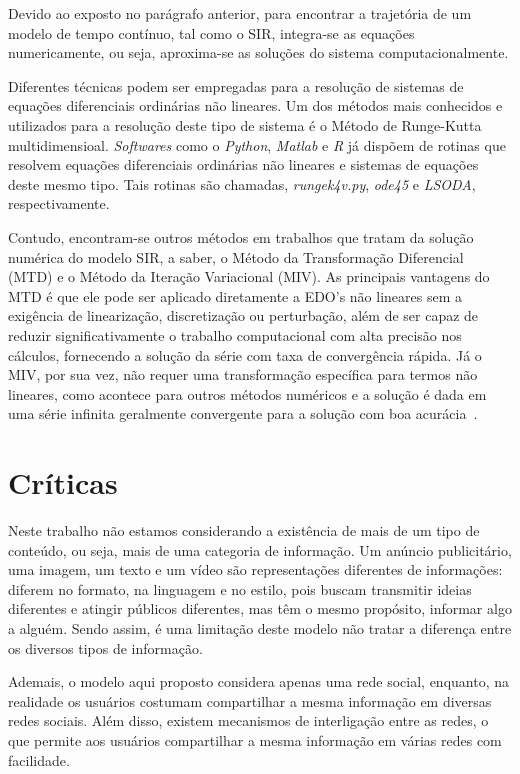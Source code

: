 \documentclass[
	12pt,				%
	openright,			%
	oneside,			%
	a4paper,			%
	english,			%
	french,				%
	spanish,			%
	brazil				%
	]{abntex2}
\begin{document}
Devido ao exposto no parágrafo anterior, para encontrar a trajetória
de um modelo de tempo contínuo, tal como o SIR, integra-se as equações
numericamente, ou seja, aproxima-se as soluções do sistema
computacionalmente.

Diferentes técnicas podem ser empregadas para a resolução de sistemas
de equações diferenciais ordinárias não lineares. Um dos métodos mais
conhecidos e utilizados para a resolução deste tipo de sistema é o
Método de Runge-Kutta multidimensioal. \emph{Softwares} como o
\emph{Python}, \emph{Matlab} e \emph{R} já dispõem de rotinas que
resolvem equações diferenciais ordinárias não lineares e sistemas de
equações deste mesmo tipo. Tais rotinas são chamadas,
\emph{rungek4v.py}, \emph{ode45} e \emph{LSODA}, respectivamente.

Contudo, encontram-se outros métodos em trabalhos que tratam da
solução numérica do modelo SIR, a saber, o Método da Transformação
Diferencial (MTD) e o Método da Iteração Variacional (MIV). As
principais vantagens do MTD é que ele pode ser aplicado diretamente a
EDO's não lineares sem a exigência de linearização, discretização ou
perturbação, além de ser capaz de reduzir significativamente o
trabalho computacional com alta precisão nos cálculos, fornecendo a
solução da série com taxa de convergência rápida. Já o MIV, por sua
vez, não requer uma transformação específica para termos não lineares,
como acontece para outros métodos numéricos e a solução é dada em uma
série infinita geralmente convergente para a solução com boa
acurácia~\cite{akinboro2014}.


\chapter{Críticas}
Neste trabalho não estamos considerando a existência de mais de um
tipo de conteúdo, ou seja, mais de uma categoria de informação.  Um
anúncio publicitário, uma imagem, um texto e um vídeo são
representações diferentes de informações: diferem no formato, na
linguagem e no estilo, pois buscam transmitir ideias diferentes e
atingir públicos diferentes, mas têm o mesmo propósito, informar algo
a alguém.  Sendo assim, é uma limitação deste modelo não tratar a
diferença entre os diversos tipos de informação.

Ademais, o modelo aqui proposto considera apenas uma rede social,
enquanto, na realidade os usuários costumam compartilhar a mesma
informação em diversas redes sociais.  Além disso, existem mecanismos
de interligação entre as redes, o que permite aos usuários
compartilhar a mesma informação em várias redes com facilidade.
\end{document}
